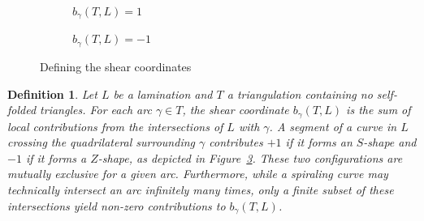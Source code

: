 \documentclass{article}
\newtheorem{definition}{Definition}
\theoremstyle{remark}
\begin{document}
\begin{figure}[H]
    \centering
     \begin{subfigure}[b]{0.2\textwidth}
        \centering
{}
        \caption{$b_{\gamma}(T,L)=1$}
        \label{fig:shearplus}
    \end{subfigure}
    \hspace{2cm}
    \begin{subfigure}[b]{0.2\textwidth}
        \centering
{}
        \caption{$b_{\gamma}(T,L)=-1$}
        \label{fig:shearmin}
    \end{subfigure}
    \caption{Defining the shear coordinates}
    \label{fig:shear}
\end{figure}


\begin{definition}
Let $L$ be a lamination and $T$ a triangulation containing no self-folded triangles. For each arc $\gamma \in T$, the shear coordinate $b_\gamma(T, L)$ is the sum of local contributions from the intersections of $L$ with $\gamma$. A segment of a curve in $L$ crossing the quadrilateral surrounding $\gamma$ contributes $+1$ if it forms an $S$-shape and $-1$ if it forms a $Z$-shape, as depicted in Figure~\ref{fig:shear}. These two configurations are mutually exclusive for a given arc. Furthermore, while a spiraling curve may technically intersect an arc infinitely many times, only a finite subset of these intersections yield non-zero contributions to $b_\gamma(T, L)$.
\label{def:shear}
\end{definition}
\end{document}
